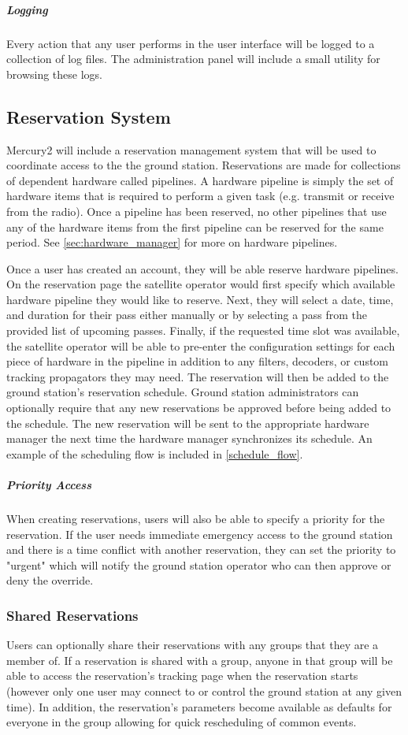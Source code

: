 \documentclass{mxl-design}
\begin{document}
\subparagraph{Logging}
Every action that any user performs in the user interface will be logged to a collection of log files. The administration panel will include a small utility for browsing these logs. 

\subsection{Reservation System}
\label{sec:reservations}
Mercury2 will include a reservation management system that will be used to coordinate access to the the ground station. Reservations are made for collections of dependent hardware called pipelines. A hardware pipeline is simply the set of hardware items that is required to perform a given task (e.g. transmit or receive from the radio). Once a pipeline has been reserved, no other pipelines that use any of the hardware items from the first pipeline can be reserved for the same period. See \ref{sec:hardware_manager} for more on hardware pipelines.

Once a user has created an account, they will be able reserve hardware pipelines. On the reservation page the satellite operator would first specify which available hardware pipeline they would like to reserve. Next, they will select a date, time, and duration for their pass either manually or by selecting a pass from the provided list of upcoming passes. Finally, if the requested time slot was available, the satellite operator will be able to pre-enter the configuration settings for each piece of hardware in the pipeline in addition to any filters, decoders, or custom tracking propagators they may need. The reservation will then be added to the ground station's reservation schedule. Ground station administrators can optionally require that any new reservations be approved before being added to the schedule. The new reservation will be sent to the appropriate hardware manager the next time the hardware manager synchronizes its schedule. An example of the scheduling flow is included in \ref{schedule_flow}.

\subparagraph{Priority Access} When creating reservations, users will also be able to specify a priority for the reservation. If the user needs immediate emergency access to the ground station and there is a time conflict with another reservation, they can set the priority to "urgent" which will notify the ground station operator who can then approve or deny the override.

\subsubsection{Shared Reservations}
Users can optionally share their reservations with any groups that they are a member of. If a reservation is shared with a group, anyone in that group will be able to access the reservation's tracking page when the reservation starts (however only one user may connect to or control the ground station at any given time). In addition, the reservation's parameters become available as defaults for everyone in the group allowing for quick rescheduling of common events.
\end{document}
